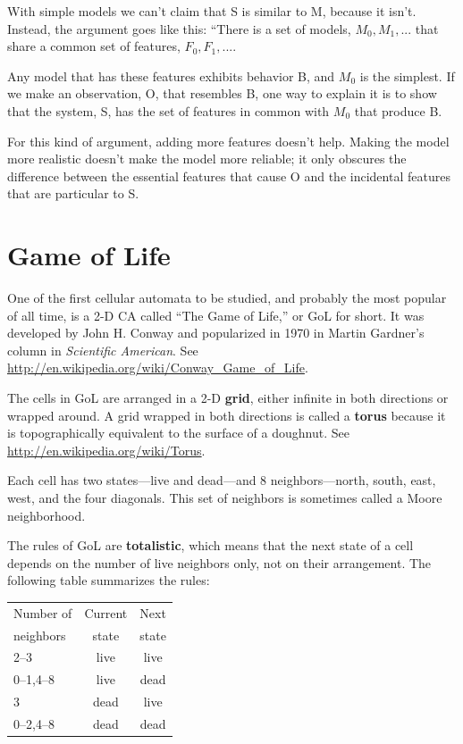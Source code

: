\documentclass[10pt]{book}
\begin{document}
With simple models we can't claim that S is similar to M, because it
isn't.  Instead, the argument goes like this: ``There is a set of
models, ${M_0, M_1, ...}$ that share a common set of features, ${F_0,
  F_1, ...}$.

Any model that has these features exhibits behavior B, and $M_0$ is
the simplest.  If we make an observation, O, that resembles B, one way
to explain it is to show that the system, S, has the set of
features in common with $M_0$ that produce B.

For this kind of argument, adding more features doesn't help.  Making
the model more realistic doesn't make the model more reliable; it only
obscures the difference between the essential features that cause O
and the incidental features that are particular to S.


\chapter{Game of Life}
\label{life}

One of the first cellular automata to be studied, and probably the
most popular of all time, is a 2-D CA called ``The Game of Life,'' or GoL
for short.  It was developed by John H. Conway and popularized in 1970
in Martin Gardner's column in {\em Scientific American}.
See \url{http://en.wikipedia.org/wiki/Conway_Game_of_Life}.

The cells in GoL are arranged in a 2-D {\bf grid},
either infinite in both
directions or wrapped around.  A grid wrapped
in both directions is called a {\bf torus} because it is topographically
equivalent to the surface of a doughnut.
See \url{http://en.wikipedia.org/wiki/Torus}.

Each cell has two states---live and dead---and 8 neighbors---north,
south, east, west, and the four diagonals.  This set of neighbors
is sometimes called a Moore neighborhood.

The rules of GoL are {\bf totalistic}, which means that the next
state of a cell depends on the number of live neighbors only,
not on their arrangement.  The following table summarizes the
rules:

\begin{tabular}{|l|c|c|}
\hline
Number of     &   Current      & Next \\
neighbors     &   state        & state \\
\hline
2--3          &   live           & live         \\
0--1,4--8     &   live           & dead         \\
3             &   dead           & live         \\
0--2,4--8     &   dead           & dead         \\
\hline
\end{tabular}
\end{document}
